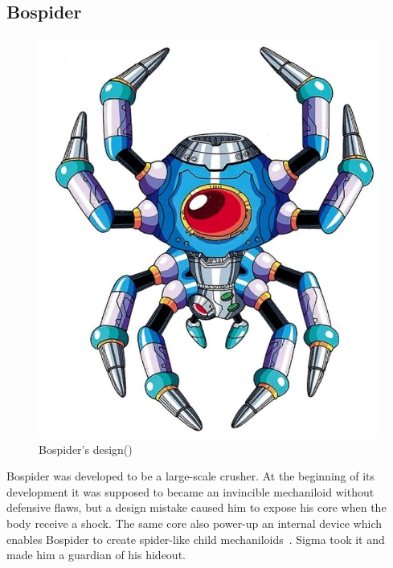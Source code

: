 \subsection{Bospider}\label{boss:bospider}
\begin{figure}[htp]
	\centering
	\includegraphics[width=0.35\linewidth]{figures/X1/Sigma_stages/Bospider.jpg}
	\caption{Bospider's design(\cite{book:MMX_Complete_art})}
\end{figure}
Bospider was developed to be a large-scale crusher. At the beginning of its development it was supposed to became an invincible mechaniloid without defensive flaws, but a design mistake caused him to expose his core when the body receive a shock. The same core also power-up an internal device which enables Bospider to create spider-like child mechaniloids~\cite{wayback:X_resources}. Sigma took it and made him a guardian of his hideout.


